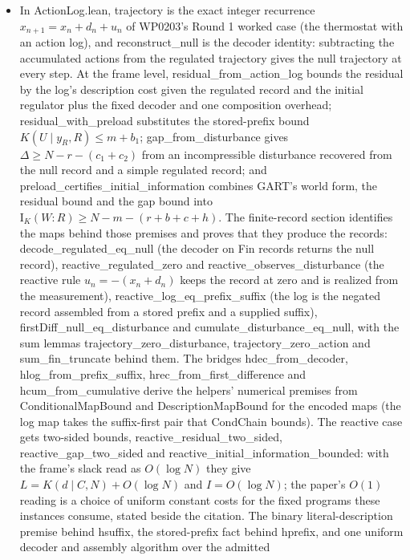 \documentclass[11pt,a4paper]{article}
\newcommand{\lean}[1]{{\ttfamily\small
  \let\leanunderscore\_\def\_{\leanunderscore\allowbreak}#1}}
\newcommand{\Ik}{\mathrm{I}_K}
\begin{document}
\begin{itemize}[leftmargin=1.4em,itemsep=1pt]
balance; grounding remains its measurement extension.
\item In \lean{ActionLog.lean}, \lean{trajectory} is the exact integer recurrence
$x_{n+1}=x_n+d_n+u_n$ of WP0203's Round 1 worked case (the thermostat with an action log),
and \lean{reconstruct\_null} is the decoder identity: subtracting the accumulated actions
from the regulated trajectory gives the null trajectory at every step. At the frame level,
\lean{residual\_from\_action\_log} bounds the residual by the log's description cost given
the regulated record and the initial regulator plus the fixed decoder and one composition
overhead; \lean{residual\_with\_preload} substitutes the stored-prefix bound
$K(U\mid y_R,R)\le m+b_1$; \lean{gap\_from\_disturbance} gives $\Delta\ge N-r-(c_1+c_2)$ from
an incompressible disturbance recovered from the null record and a simple regulated record;
and \lean{preload\_certifies\_initial\_information} combines GART's world form, the residual
bound and the gap bound into $\Ik(W{:}R)\ge N-m-(r+b+c+h)$. The finite-record section
identifies the maps behind those premises and proves that they produce the records:
\lean{decode\_regulated\_eq\_null} (the decoder on \lean{Fin} records returns the null record),
\lean{reactive\_regulated\_zero} and \lean{reactive\_observes\_disturbance} (the reactive rule
$u_n=-(x_n+d_n)$ keeps the record at zero and is realized from the measurement),
\lean{reactive\_log\_eq\_prefix\_suffix} (the log is the negated record assembled from a
stored prefix and a supplied suffix), \lean{firstDiff\_null\_eq\_disturbance} and
\lean{cumulate\_disturbance\_eq\_null}, with the sum lemmas
\lean{trajectory\_zero\_disturbance}, \lean{trajectory\_zero\_action} and
\lean{sum\_fin\_truncate} behind them. The bridges \lean{hdec\_from\_decoder},
\lean{hlog\_from\_prefix\_suffix}, \lean{hrec\_from\_first\_difference} and
\lean{hcum\_from\_cumulative} derive the helpers' numerical premises from
\lean{ConditionalMapBound} and \lean{DescriptionMapBound} for the encoded maps (the log map
takes the suffix-first pair that \lean{CondChain} bounds). The reactive case gets two-sided
bounds, \lean{reactive\_residual\_two\_sided}, \lean{reactive\_gap\_two\_sided} and
\lean{reactive\_initial\_information\_bounded}: with the frame's slack read as $O(\log N)$ they
give $L=K(d\mid C,N)+O(\log N)$ and $I=O(\log N)$; the paper's $O(1)$ reading is a choice of
uniform constant costs for the fixed programs these instances consume, stated beside the
citation. The binary literal-description premise behind \lean{hsuffix}, the stored-prefix
fact behind \lean{hprefix}, and one uniform decoder and assembly algorithm over the admitted

\end{itemize}
\end{document}
